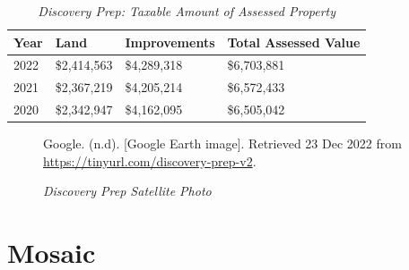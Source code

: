 \begin{table}[hbtp]
  \SingleSpacing%
  \caption[Discovery Prep: Taxable Amount of Assessed Propery]{\textit{Discovery Prep: Taxable Amount of Assessed Property}}\label{tab:discovery-prep-taxable-amount}
  \begin{tabular}{llll}
    \toprule
    Year & Land        & Improvements & Total Assessed Value \\
    \midrule
    2022 & \$2,414,563 & \$4,289,318  & \$6,703,881 \\
    2021 & \$2,367,219 & \$4,205,214  & \$6,572,433 \\
    2020 & \$2,342,947 & \$4,162,095  & \$6,505,042 \\
    \bottomrule
  \end{tabular}
\end{table}

\begin{figure}[hbtp]
  \caption[Discovery Prep Satellite Photo]{\textit{Discovery Prep Satellite Photo}}%
  \label{fig:discovery-prep-sat-photo}
  {Google. (n.d). [Google Earth image]. Retrieved 23 Dec 2022 from \url{https://tinyurl.com/discovery-prep-v2}.}
\end{figure}


\clearpage
\section{Mosaic}\label{sec:mosaic-info}\indent

